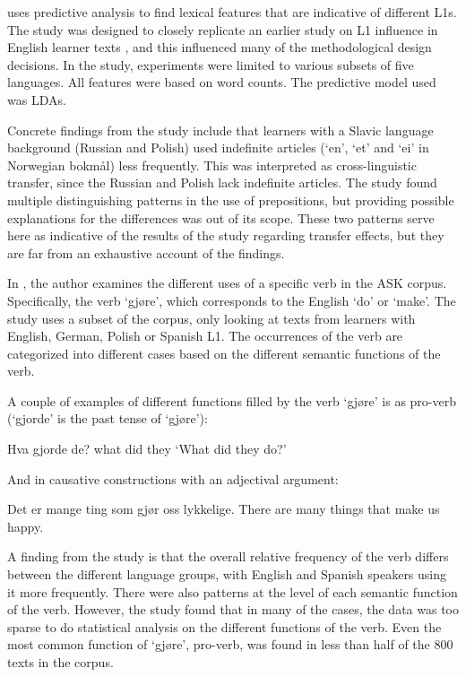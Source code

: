 \textcite{pepper2012} uses predictive analysis to find lexical features that
are indicative of different \acp{L1}. The study was designed to closely
replicate an earlier study on \ac{L1} influence in English learner texts
\autocite{jarvis2012detecting}, and this influenced many of the
methodological design decisions. In the \citeauthor{pepper2012} study,
experiments were limited to various subsets of five languages. All features
were based on word counts. The predictive model used was \acp{LDA}.

Concrete findings from the \citeauthor{pepper2012} study include that
learners with a Slavic language background (Russian and Polish) used
indefinite articles (`en', `et' and `ei' in Norwegian bokmål) less
frequently. This was interpreted as cross-linguistic transfer, since the
Russian and Polish lack indefinite articles. The study found multiple
distinguishing patterns in the use of prepositions, but providing possible
explanations for the differences was out of its scope. These two patterns
serve here as indicative of the results of the study regarding transfer
effects, but they are far from an exhaustive account of the findings.

In \textcite{golden2016ask}, the author examines the different uses of a
specific verb in the ASK corpus. Specifically, the verb `gjøre', which
corresponds to the English `do' or `make'. The study uses a subset of the
corpus, only looking at texts from learners with English, German, Polish or
Spanish \ac{L1}. The occurrences of the verb are categorized into different
cases based on the different semantic functions of the verb.

A couple of examples of different functions filled by the verb `gjøre' is
as pro-verb (`gjorde' is the past tense of `gjøre'):

\begin{example}
\gll Hva  gjorde  de?
     what did     they
\glt `What did they do?'
\glend
\end{example}

And in causative constructions with an adjectival argument:

\begin{example}
\gll Det   er  mange ting   som  gjør oss lykkelige.
     There are many  things that make us  happy.
\gln
\glend
\end{example}

A finding from the study is that the overall relative frequency of the verb
differs between the different language groups, with English and Spanish
speakers using it more frequently. There were also patterns at the level of
each semantic function of the verb. However, the study found that in many of
the cases, the data was too sparse to do statistical analysis on the
different functions of the verb. Even the most common function of `gjøre',
pro-verb, was found in less than half of the 800 texts in the corpus.

